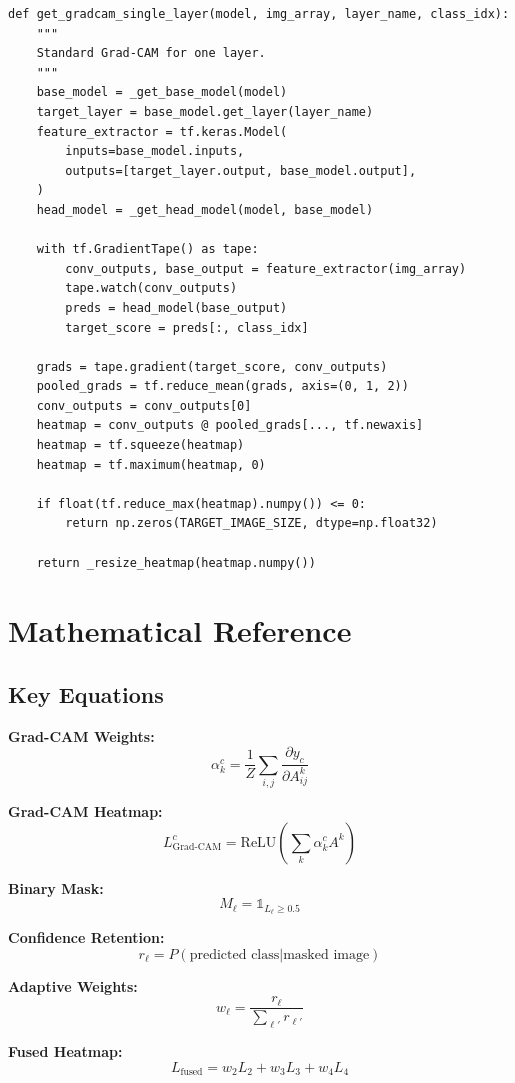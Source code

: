 \documentclass[12pt,a4paper,oneside]{book}
\begin{document}
\begin{lstlisting}
def get_gradcam_single_layer(model, img_array, layer_name, class_idx):
    """
    Standard Grad-CAM for one layer.
    """
    base_model = _get_base_model(model)
    target_layer = base_model.get_layer(layer_name)
    feature_extractor = tf.keras.Model(
        inputs=base_model.inputs,
        outputs=[target_layer.output, base_model.output],
    )
    head_model = _get_head_model(model, base_model)

    with tf.GradientTape() as tape:
        conv_outputs, base_output = feature_extractor(img_array)
        tape.watch(conv_outputs)
        preds = head_model(base_output)
        target_score = preds[:, class_idx]

    grads = tape.gradient(target_score, conv_outputs)
    pooled_grads = tf.reduce_mean(grads, axis=(0, 1, 2))
    conv_outputs = conv_outputs[0]
    heatmap = conv_outputs @ pooled_grads[..., tf.newaxis]
    heatmap = tf.squeeze(heatmap)
    heatmap = tf.maximum(heatmap, 0)

    if float(tf.reduce_max(heatmap).numpy()) <= 0:
        return np.zeros(TARGET_IMAGE_SIZE, dtype=np.float32)

    return _resize_heatmap(heatmap.numpy())
\end{lstlisting}

\chapter{Mathematical Reference}
\label{app:math}

\section{Key Equations}

\textbf{Grad-CAM Weights:}
\begin{equation}
\alpha_k^c = \frac{1}{Z} \sum_{i,j} \frac{\partial y_c}{\partial A_{ij}^k}
\end{equation}

\textbf{Grad-CAM Heatmap:}
\begin{equation}
L_{\text{Grad-CAM}}^c = \text{ReLU}\left(\sum_{k} \alpha_k^c A^k\right)
\end{equation}

\textbf{Binary Mask:}
\begin{equation}
M_\ell = \mathbb{1}_{L_\ell \geq 0.5}
\end{equation}

\textbf{Confidence Retention:}
\begin{equation}
r_\ell = P(\text{predicted class} | \text{masked image})
\end{equation}

\textbf{Adaptive Weights:}
\begin{equation}
w_\ell = \frac{r_\ell}{\sum_{\ell'} r_{\ell'}}
\end{equation}

\textbf{Fused Heatmap:}
\begin{equation}
L_{\text{fused}} = w_2 L_2 + w_3 L_3 + w_4 L_4
\end{equation}
\end{document}
